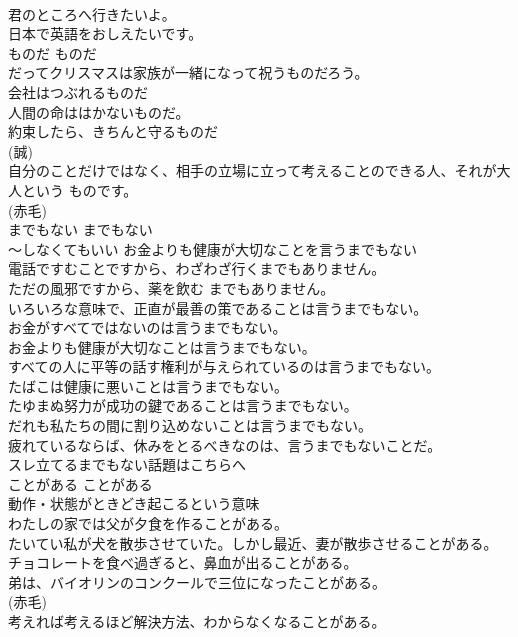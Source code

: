 \documentclass[8pt]{extreport}
\begin{document}
\begin{CJK}{UTF8}{min}
\\	君のところへ行きたいよ。  
\\	日本で英語をおしえたいです。  
\\	ものだ	ものだ	
\\	だってクリスマスは家族が一緒になって祝うものだろう。  
\\	会社はつぶれるものだ  
\\	人間の命ははかないものだ。  
\\	約束したら、きちんと守るものだ  
\\	(誠)
\\	自分のことだけではなく、相手の立場に立って考えることのできる人、それが大人という ものです。  
\\	(赤毛)
\\	までもない	までもない	
\\	〜しなくてもいい	お金よりも健康が大切なことを言うまでもない 
\\	電話ですむことですから、わざわざ行くまでもありません。  
\\	ただの風邪ですから、薬を飲む までもありません。  
\\	いろいろな意味で、正直が最善の策であることは言うまでもない。  
\\	お金がすべてではないのは言うまでもない。  
\\	お金よりも健康が大切なことは言うまでもない。  
\\	すべての人に平等の話す権利が与えられているのは言うまでもない。  
\\	たばこは健康に悪いことは言うまでもない。  
\\	たゆまぬ努力が成功の鍵であることは言うまでもない。  
\\	だれも私たちの間に割り込めないことは言うまでもない。  
\\	疲れているならば、休みをとるべきなのは、言うまでもないことだ。  
\\	スレ立てるまでもない話題はこちらへ   
\\	ことがある	ことがある	
\\	動作・状態がときどき起こるという意味	
\\	わたしの家では父が夕食を作ることがある。  
\\	たいてい私が犬を散歩させていた。しかし最近、妻が散歩させることがある。  
\\	チョコレートを食べ過ぎると、鼻血が出ることがある。  
\\	弟は、バイオリンのコンクールで三位になったことがある。  
\\	(赤毛)
\\	考えれば考えるほど解決方法、わからなくなることがある。  

\end{CJK}
\end{document}
